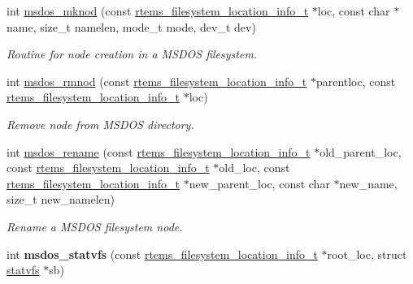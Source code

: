 \begin{DoxyCompactItemize}
int \mbox{\hyperlink{group__libfs__msdos_gad2d321f559fc408da551e9b13adb5241}{msdos\+\_\+mknod}} (const \mbox{\hyperlink{group__LibIO_ga3252b3d31ee3c49ffff0b7604a676864}{rtems\+\_\+filesystem\+\_\+location\+\_\+info\+\_\+t}} $\ast$loc, const char $\ast$name, size\+\_\+t namelen, mode\+\_\+t mode, dev\+\_\+t dev)
\begin{DoxyCompactList}\small\item\em Routine for node creation in a M\+S\+D\+OS filesystem. \end{DoxyCompactList}\item 
int \mbox{\hyperlink{group__libfs__msdos_gadc2a558d9dd4a7b65b22cd0ec527c236}{msdos\+\_\+rmnod}} (const \mbox{\hyperlink{group__LibIO_ga3252b3d31ee3c49ffff0b7604a676864}{rtems\+\_\+filesystem\+\_\+location\+\_\+info\+\_\+t}} $\ast$parentloc, const \mbox{\hyperlink{group__LibIO_ga3252b3d31ee3c49ffff0b7604a676864}{rtems\+\_\+filesystem\+\_\+location\+\_\+info\+\_\+t}} $\ast$loc)
\begin{DoxyCompactList}\small\item\em Remove node from M\+S\+D\+OS directory. \end{DoxyCompactList}\item 
int \mbox{\hyperlink{group__libfs__msdos_ga8f13c780cd05667aef2b563ee03154c1}{msdos\+\_\+rename}} (const \mbox{\hyperlink{group__LibIO_ga3252b3d31ee3c49ffff0b7604a676864}{rtems\+\_\+filesystem\+\_\+location\+\_\+info\+\_\+t}} $\ast$old\+\_\+parent\+\_\+loc, const \mbox{\hyperlink{group__LibIO_ga3252b3d31ee3c49ffff0b7604a676864}{rtems\+\_\+filesystem\+\_\+location\+\_\+info\+\_\+t}} $\ast$old\+\_\+loc, const \mbox{\hyperlink{group__LibIO_ga3252b3d31ee3c49ffff0b7604a676864}{rtems\+\_\+filesystem\+\_\+location\+\_\+info\+\_\+t}} $\ast$new\+\_\+parent\+\_\+loc, const char $\ast$new\+\_\+name, size\+\_\+t new\+\_\+namelen)
\begin{DoxyCompactList}\small\item\em Rename a M\+S\+D\+OS filesystem node. \end{DoxyCompactList}\item 
\mbox{\label{group__libfs__msdos_ga5471eb0531df259fec6703b9c0942dfa}} 
int {\bfseries msdos\+\_\+statvfs} (const \mbox{\hyperlink{group__LibIO_ga3252b3d31ee3c49ffff0b7604a676864}{rtems\+\_\+filesystem\+\_\+location\+\_\+info\+\_\+t}} $\ast$root\+\_\+loc, struct \mbox{\hyperlink{structstatvfs}{statvfs}} $\ast$sb)
\item 
\mbox{\label{group__libfs__msdos_gaf5022f9468caad21adc024aa37dc7767}} 

\end{DoxyCompactItemize}
